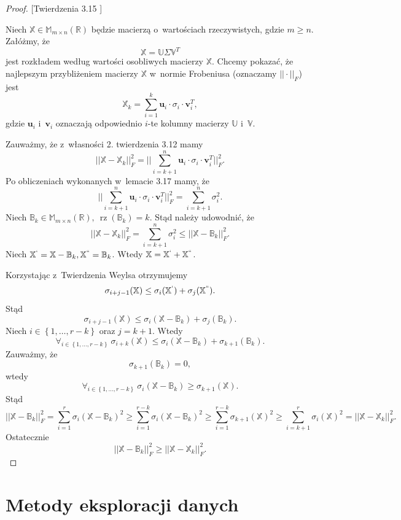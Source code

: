 \documentclass[12pt,a4paper]{report}
\newcommand{\set}[1]{\left\lbrace {#1} \right\rbrace}
\newcommand{\setR}{\mathbb{R}}
\newcommand{\rz}[1]{\operatorname{rz}\left({#1} \right)}
\begin{document}
\begin{proof}{[Twierdzenia 3.15 {\citep[Tw. 4.21]{tsvdalra}}]} 

Niech $\mathbb{X} \in \mathbb{M}_{m\times n}(\setR)$ będzie macierzą o~wartościach rzeczywistych, gdzie $m \geqslant n$.
Załóżmy, że
$$
\mathbb{X}=\mathbb{U} \Sigma \mathbb{V}^T
$$
jest rozkładem według wartości osobliwych macierzy $\mathbb{X}$.
Chcemy pokazać, że najlepszym przybliżeniem macierzy $\mathbb{X}$ w~normie Frobeniusa (oznaczamy $||\cdot||_F$) jest
$$
\mathbb{X}_k = \sum_{i=1}^k \mathbf{u}_i\cdot \sigma_i \cdot \mathbf{v}_i^T,
$$
gdzie $\mathbf{u}_i$ i~$\mathbf{v}_i$ oznaczają odpowiednio $i$-te kolumny macierzy $\mathbb{U}$ i~$\mathbb{V}$.

Zauważmy, że z~własności 2. twierdzenia 3.12 mamy
$$
||\mathbb{X} - \mathbb{X}_k||_F^2 = ||\sum_{i=k+1}^n \mathbf{u}_i \cdot \sigma_i \cdot \mathbf{v}_i^T||_F^2.
$$
Po obliczeniach wykonanych w~lemacie 3.17 mamy, że
$$
||\sum_{i=k+1}^n \mathbf{u}_i \cdot \sigma_i \cdot \mathbf{v}_i^T||_F^2 =\sum_{i=k+1}^n \sigma_i^2.
$$
Niech $\mathbb{B}_k \in \mathbb{M}_{m \times n}(\setR), \: \rz{\mathbb{B}_k} = k$. 
Stąd należy udowodnić, że
$$
||\mathbb{X} - \mathbb{X}_k||_F^2 = \sum_{i=k+1}^n \sigma_i^2 \leqslant ||\mathbb{X} - \mathbb{B}_k||_F^2.
$$
Niech $\mathbb{X}^{`} = \mathbb{X}-\mathbb{B}_k, \mathbb{X}^{``} = \mathbb{B}_k$.
Wtedy $\mathbb{X} = \mathbb{X}^{`} + \mathbb{X}^{``}$. 

Korzystając z~Twierdzenia Weylsa otrzymujemy
$$
\sigma_{i+j-1}(\mathbb{X})\leq \sigma_{i}(\mathbb{X}^{`}) + \sigma_j(\mathbb{X}^{``}).
$$ 
Stąd
$$
\sigma_{i+j-1}(\mathbb{X})\leq \sigma_{i}(\mathbb{X} - \mathbb{B}_k) + \sigma_j(\mathbb{B}_k).
$$ 
Niech $i \in \set{1, \ldots, r-k}$ oraz $j= k+1$. Wtedy
$$
\forall_{i \in \set{1, \ldots, r-k}} \: \sigma_{i+k}(\mathbb{X})\leq \sigma_{i}(\mathbb{X} - \mathbb{B}_k) + \sigma_{k+1}(\mathbb{B}_k).
$$ 
Zauważmy, że
$$
\sigma_{k+1}(\mathbb{B}_k)=0,
$$
wtedy
$$
\forall_{i \in \set{1, \ldots, r-k}} \: \sigma_i(\mathbb{X}-\mathbb{B}_k)\geq \sigma_{k+1}(\mathbb{X}).
$$
Stąd
$$
||\mathbb{X} - \mathbb{B}_k||_F^2 = \sum_{i=1}^r \sigma_i(\mathbb{X}-\mathbb{B}_k)^2 \geq \sum_{i=1}^{r-k} \sigma_i(\mathbb{X}-\mathbb{B}_k)^2 \geq \sum_{i=1}^{r-k} \sigma_{k+1}(\mathbb{X})^2 \geq \sum_{i = k+1}^r \sigma_i(\mathbb{X})^2 = ||\mathbb{X}-\mathbb{X}_k||_F^2 .
$$
Ostatecznie
$$
||\mathbb{X} - \mathbb{B}_k||_F^2 \geqslant ||\mathbb{X}-\mathbb{X}_k||_F^2.
$$
\end{proof}


\section{Metody eksploracji danych}
\end{document}
